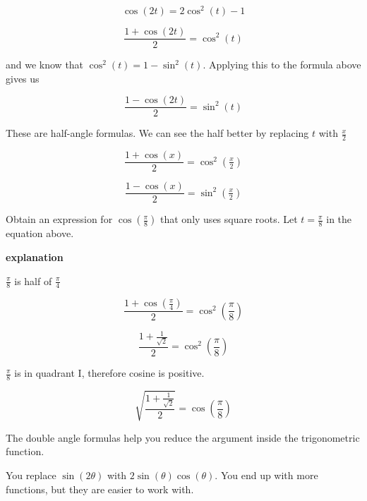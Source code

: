 \documentclass{ximera}
\begin{document}
\[   \cos(2t)  =  2 \cos^2(t) - 1 \]


\[   \frac{1 + \cos(2t)}{2}  =   \cos^2(t)  \]



and we know that $\cos^2(t) = 1- \sin^2(t)$. Applying this to the formula above gives us

\[  \frac{1 -  \cos(2t)}{2}  =  \sin^2(t)     \]



These are half-angle formulas.  We can see the half better by replacing $t$ with $\frac{x}{2}$



\[   \frac{1 + \cos(x)}{2}  =   \cos^2\left( \tfrac{x}{2} \right)  \]



\[   \frac{1 - \cos(x)}{2}  =   \sin^2\left( \tfrac{x}{2} \right)  \]







\begin{example}

Obtain an expression for $\cos\left(  \frac{\pi}{8}  \right)$ that only uses square roots.
Let $t = \frac{\pi}{8}$ in the equation above.



\textbf{\textcolor{red!75!green}{explanation}} 


$\frac{\pi}{8}$ is half of $\frac{\pi}{4}$




\[   \frac{1 + \cos( \frac{\pi}{4} )}{2}  =   \cos^2\left( \frac{\pi}{8} \right)  \]


\[   \frac{1 + \frac{1}{\sqrt{2}}}{2}  =   \cos^2\left( \frac{\pi}{8} \right)  \]



$\frac{\pi}{8}$ is in quadrant I, therefore cosine is positive.




\[   \sqrt{ \frac{1 + \frac{1}{\sqrt{2}}}{2} }  =   \cos\left( \frac{\pi}{8} \right)  \]







\end{example}


The double angle formulas help you reduce the argument inside the trigonometric function. 


You replace $\sin(2 \theta)$ with $2 \sin(\theta) \cos(\theta)$.  You end up with more functions, but they are easier to work with. 
\end{document}

